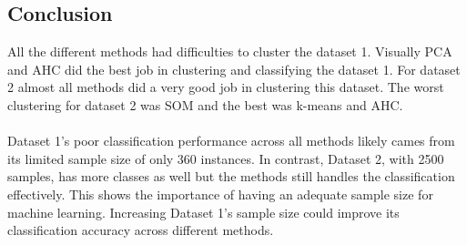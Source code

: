 \documentclass[12pt]{report}
\begin{document}
	\subsection{Conclusion}
	All the different methods had difficulties to cluster the dataset 1. Visually PCA and AHC did the best job in clustering and classifying the dataset 1. For dataset 2 almost all methods did a very good job in clustering this dataset. The worst clustering for dataset 2 was SOM and the best was k-means and AHC. \\
	\\
	Dataset 1's poor classification performance across all methods likely cames from its limited sample size of only 360 instances. In contrast, Dataset 2, with 2500 samples, has more classes as well but the methods still handles the classification effectively. This shows the importance of having an adequate sample size for machine learning. Increasing Dataset 1's sample size could improve its classification accuracy across different methods.
	 
	 
\end{document}
